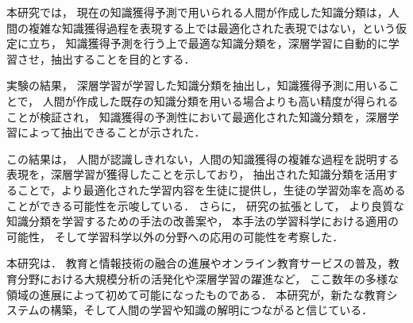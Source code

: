 本研究では，
現在の知識獲得予測で用いられる人間が作成した知識分類は，人間の複雑な知識獲得過程を表現する上では最適化された表現ではない，という仮定に立ち，
知識獲得予測を行う上で最適な知識分類を，深層学習に自動的に学習させ，抽出することを目的とする．

実験の結果，
深層学習が学習した知識分類を抽出し，知識獲得予測に用いることで，
人間が作成した既存の知識分類を用いる場合よりも高い精度が得られることが検証され，
知識獲得の予測性において最適化された知識分類を，深層学習によって抽出できることが示された．

この結果は，
人間が認識しきれない，人間の知識獲得の複雑な過程を説明する表現を，深層学習が獲得したことを示しており，
抽出された知識分類を活用することで，より最適化された学習内容を生徒に提供し，生徒の学習効率を高めることができる可能性を示唆している．
さらに，
研究の拡張として，
より良質な知識分類を学習するための手法の改善案や，
本手法の学習科学における適用の可能性，
そして学習科学以外の分野への応用の可能性を考察した．


本研究は．
教育と情報技術の融合の進展やオンライン教育サービスの普及，教育分野における大規模分析の活発化や深層学習の躍進など，
ここ数年の多様な領域の進展によって初めて可能になったものである．
本研究が，新たな教育システムの構築，そして人間の学習や知識の解明につながると信じている．
